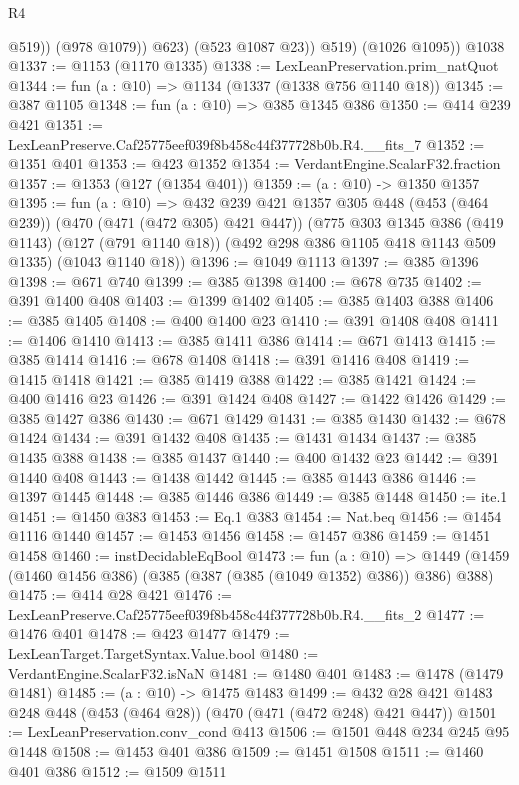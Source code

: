 \begin{lexlean}{R4}
\begin{coremodule}
                  @519))
              (@978 @1079))
            @623)
          (@523 @1087 @23))
        @519)
      (@1026 @1095))
    @1038
@1337 := @1153 (@1170 @1335)
@1338 := LexLeanPreservation.prim_natQuot
@1344 := fun (a : @10) => @1134 (@1337 (@1338 @756 @1140 @18))
@1345 := @387 @1105
@1348 := fun (a : @10) => @385 @1345 @386
@1350 := @414 @239 @421
@1351 := LexLeanPreserve.Caf25775eef039f8b458c44f377728b0b.R4.__fits_7
@1352 := @1351 @401
@1353 := @423 @1352
@1354 := VerdantEngine.ScalarF32.fraction
@1357 := @1353 (@127 (@1354 @401))
@1359 := (a : @10) -> @1350 @1357
@1395 := fun (a : @10) =>
  @432
    @239
    @421
    @1357
    @305
    @448
    (@453 (@464 @239))
    (@470 (@471 (@472 @305) @421 @447))
    (@775
      @303
      @1345
      @386
      (@419 @1143)
      (@127 (@791 @1140 @18))
      (@492 @298 @386 @1105 @418 @1143 @509 @1335)
      (@1043 @1140 @18))
@1396 := @1049 @1113
@1397 := @385 @1396
@1398 := @671 @740
@1399 := @385 @1398
@1400 := @678 @735
@1402 := @391 @1400 @408
@1403 := @1399 @1402
@1405 := @385 @1403 @388
@1406 := @385 @1405
@1408 := @400 @1400 @23
@1410 := @391 @1408 @408
@1411 := @1406 @1410
@1413 := @385 @1411 @386
@1414 := @671 @1413
@1415 := @385 @1414
@1416 := @678 @1408
@1418 := @391 @1416 @408
@1419 := @1415 @1418
@1421 := @385 @1419 @388
@1422 := @385 @1421
@1424 := @400 @1416 @23
@1426 := @391 @1424 @408
@1427 := @1422 @1426
@1429 := @385 @1427 @386
@1430 := @671 @1429
@1431 := @385 @1430
@1432 := @678 @1424
@1434 := @391 @1432 @408
@1435 := @1431 @1434
@1437 := @385 @1435 @388
@1438 := @385 @1437
@1440 := @400 @1432 @23
@1442 := @391 @1440 @408
@1443 := @1438 @1442
@1445 := @385 @1443 @386
@1446 := @1397 @1445
@1448 := @385 @1446 @386
@1449 := @385 @1448
@1450 := ite.{1}
@1451 := @1450 @383
@1453 := Eq.{1} @383
@1454 := Nat.beq
@1456 := @1454 @1116 @1440
@1457 := @1453 @1456
@1458 := @1457 @386
@1459 := @1451 @1458
@1460 := instDecidableEqBool
@1473 := fun (a : @10) =>
  @1449 (@1459 (@1460 @1456 @386) (@385 (@387 (@385 (@1049 @1352) @386)) @386) @388)
@1475 := @414 @28 @421
@1476 := LexLeanPreserve.Caf25775eef039f8b458c44f377728b0b.R4.__fits_2
@1477 := @1476 @401
@1478 := @423 @1477
@1479 := LexLeanTarget.TargetSyntax.Value.bool
@1480 := VerdantEngine.ScalarF32.isNaN
@1481 := @1480 @401
@1483 := @1478 (@1479 @1481)
@1485 := (a : @10) -> @1475 @1483
@1499 := @432 @28 @421 @1483 @248 @448 (@453 (@464 @28)) (@470 (@471 (@472 @248) @421 @447))
@1501 := LexLeanPreservation.conv_cond @413
@1506 := @1501 @448 @234 @245 @95 @1448
@1508 := @1453 @401 @386
@1509 := @1451 @1508
@1511 := @1460 @401 @386
@1512 := @1509 @1511

\end{coremodule}
\end{lexlean}
